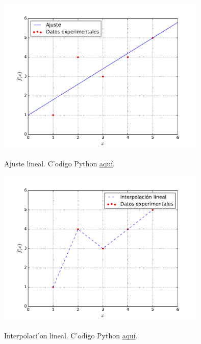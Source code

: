 \documentclass[a4paper]{report}
\begin{document}
\begin{figure}[h!]
\begin{center}
\includegraphics[width=10cm]{figs/fig-mmc.pdf}\label{intmc}
\caption{Ajuste lineal. C'odigo Python \href{https://github.com/gfrubi/Lab/blob/master/python/fig-mmc.py}{aqu\'i}.}
\end{center}
\end{figure}

\begin{figure}[h!]
\begin{center}
\includegraphics[width=10cm]{figs/fig-int-lineal.pdf}\label{intil}
\caption{Interpolaci'on lineal. C'odigo Python \href{https://github.com/gfrubi/Lab/blob/master/python/fig-int-lineal.py}{aqu\'i}.}
\end{center}
\end{figure}
\end{document}

